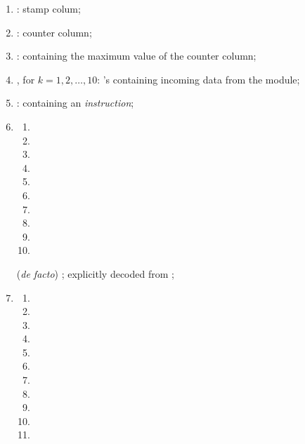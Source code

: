 \begin{enumerate}
	\item \oobStamp{}:
		stamp colum;
	\item \ct{}:
		counter column;
	\item \maxCt{}:
		\ccc{} containing the maximum value of the counter column;
	\item
		\godGiven{}
		, for $k = 1, 2, \dots, 10$:
		\ccc{}'s containing incoming data from the \hubMod{} module;
	\item
		\godGiven{}
		\oobInstruction{}:
		\ccc{} containing an \emph{\oobMod{} instruction};
	\item
		\begin{multicols}{4}
			\begin{enumerate}
				\item \oobInstIsJump{}
				\item \oobInstIsJumpI{}
				\item \oobInstIsRdc{}
				\item \oobInstIsCdl{}
				\item \oobInstIsXcall{}
				\item \oobInstIsCall{}
				\item \oobInstIsXcreate{}
				\item \oobInstIsCreate{}
				\item \oobInstIsSstore{}
				\item \oobInstIsDeployment{}
			\end{enumerate}
		\end{multicols}
		(\emph{de facto}) \ccbc{}; explicitly decoded from \oobInst{XXX};
	\item
		\begin{multicols}{3}
			\begin{enumerate}
				\item \oobInstIsEcrecover{}
				\item \oobInstIsShaTwo{}
				\item \oobInstIsRipemd{}
				\item \oobInstIsIdentity{}
				\item \oobInstIsEcadd{}
				\item \oobInstIsEcmul{}
				\item \oobInstIsEcpairing{}
				\item \oobInstIsBlakeCds{}
				\item \oobInstIsBlakeParams{}
				\item \oobInstIsModexpCds{}
				\item \oobInstIsModexpXbs{}

\end{enumerate}
\end{multicols}
\end{enumerate}
